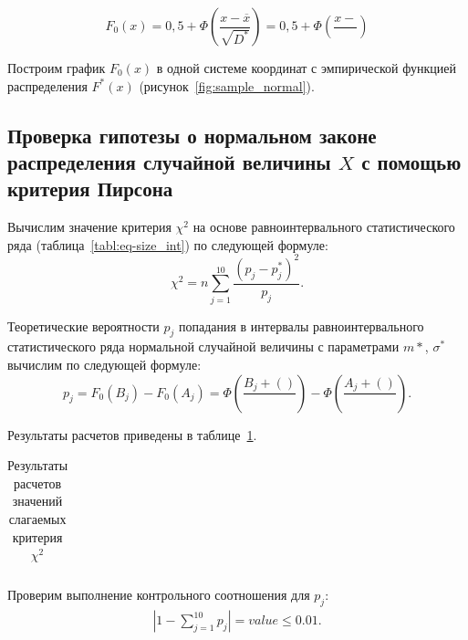 \documentclass[14pt,hidelinks]{extarticle}
\begin{document}
\begin{equation*}
  F_0(x) = 0,5 + \Phi \left( \frac{x-\overline{x}}{\sqrt{D^*}} \right) =
  0,5 + \Phi \left( \frac{x- }{} \right)
\end{equation*}

Построим график $F_0(x)$ в одной системе координат с эмпирической функцией распределения $F^*(x)$ (рисунок~\ref{fig:sample_normal}). 

\newpage

\subsection{Проверка гипотезы о нормальном законе распределения 
  случайной величины $ X $ с помощью критерия Пирсона}

Вычислим значение критерия $\chi^2$ на основе равноинтервального статистического ряда
(таблица~\ref{tabl:eq-size_int}) по следующей формуле:
\begin{equation}
  \label{eq:chi^2}
	\chi^2 = n \sum_{j=1}^{10} \frac{(p_j-p^*_j)^2}{p_j}.
\end{equation}

Теоретические вероятности $p_j$ попадания в интервалы равноинтервального статистического ряда нормальной случайной величины с параметрами $m*$, $\sigma^*$ вычислим по следующей формуле:
\begin{equation*}
  p_j = F_0(B_j) - F_0(A_j) = \Phi \left( \frac{B_j + ()}{} \right) - \Phi \left( \frac{A_j + ()}{} \right).
\end{equation*}

Результаты расчетов приведены в таблице~\ref{tabl:pirson}.

\begin{table}[h!]
  \renewcommand{\arraystretch}{1.2}
  \renewcommand{\tabcolsep}{1.2em}
  \caption{Результаты расчетов значений слагаемых критерия $ \chi^2 $\label{tabl:pirson}}
  \centering
  \small
  \begin{tabular}{|c|c|c|c|c|c|c|c|}
    \hline
    
  \end{tabular}
\end{table}

Проверим выполнение контрольного соотношения для $p_j$:
\begin{align}
	\left| 1 - \sum_{j=1}^{10} p_j \right| = value \le 0.01.
\end{align}
\end{document}
